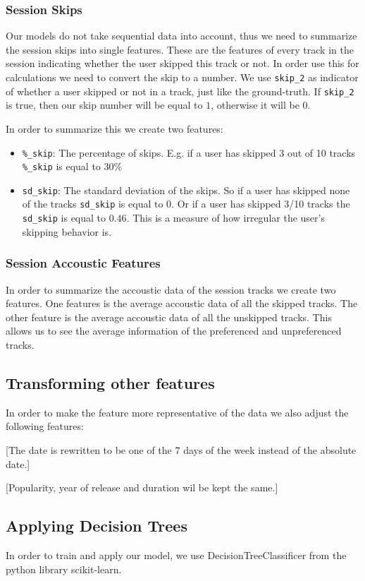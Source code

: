 \documentclass[conference]{IEEEtran}
\begin{document}
\subsubsection{Session Skips}
Our models do not take sequential data into account, 
thus we need to summarize the session skips into single features. 
These are the features of every track in the session indicating whether the user skipped this track or not.
In order use this for calculations we need to convert the skip to a number. 
We use \verb|skip_2| as indicator of whether a user skipped or not in a track, 
just like the ground-truth. 
If \verb|skip_2| is true, then our skip number will be equal to $1$, 
otherwise it will be $0$.

In order to summarize this we create two features:
\begin{itemize}
	\item \verb|%_skip|: The percentage of skips. 
		E.g. if a user has skipped 3 out of 10 tracks \verb|%_skip| is equal to $30\%$
	\item \verb|sd_skip|: The standard deviation of the skips. 
	So if a user has skipped none of the tracks \verb|sd_skip| is equal to 0. 
	Or if a user has skipped 3/10 tracks the \verb|sd_skip| is equal to $0.46$.
	This is a measure of how irregular the user's skipping behavior is.
\end{itemize}


\subsubsection{Session Accoustic Features}
In order to summarize the accoustic data of the session tracks we create two features. 
One features is the average accoustic data of all the skipped tracks. 
The other feature is the average accoustic data of all the unskipped tracks.
This allows us to see the average information of the preferenced and unpreferenced tracks.

\subsection{Transforming other features}
In order to make the feature more representative of the data we also adjust the following features:

[The date is rewritten to be one of the 7 days of the week instead of the absolute date.]

[Popularity, year of release and duration wil be kept the same.]

\subsection{Applying Decision Trees}
In order to train and apply our model, we use DecisionTreeClassificer from 
the python library scikit-learn.
\end{document}
